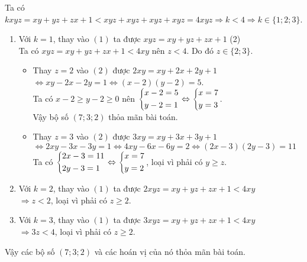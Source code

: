\begin{vd}
{Ta có $kxyz=xy+yz+zx+1<xyz+xyz+xyz+xyz=4xyz\Rightarrow k<4\Rightarrow k\in\{1;2;3\}$.
\begin{enumerate}
	\item Với $k=1$, thay vào $(1)$ ta được $xyz=xy+yz+zx+1$ \hfill (2)\\
	Ta có $xyz=xy+yz+zx+1<4xy$ nên $z<4$. Do đó $z\in\{2;3\}$.
	\begin{itemize}
		\item Thay $z=2$ vào $(2)$ được $2xy=xy+2x+2y+1$\\
		$\Leftrightarrow xy-2x-2y=1\Leftrightarrow(x-2)(y-2)=5$.\\
		Ta có $x-2\ge y-2\ge0$ nên $\left\{\begin{aligned}&x-2=5\\&y-2=1\end{aligned}\right.\Leftrightarrow\left\{\begin{aligned}&x=7\\&y=3\end{aligned}\right.$.\\
		Vậy bộ số $(7;3;2)$ thỏa mãn bài toán.
		\item Thay $z=3$ vào $(2)$ được $3xy=xy+3x+3y+1$\\
		$\Leftrightarrow2xy-3x-3y=1\Leftrightarrow4xy-6x-6y=2\Leftrightarrow(2x-3)(2y-3)=11$\\
		Ta có $\left\{\begin{aligned}&2x-3=11\\&2y-3=1\end{aligned}\right.\Leftrightarrow\left\{\begin{aligned}&x=7\\&y=2\end{aligned}\right.$, loại vì phải có $y\ge z$.
	\end{itemize}
	\item Với $k=2$, thay vào $(1)$ ta được $2xyz=xy+yz+zx+1<4xy$\\
	$\Rightarrow z<2$, loại vì phải có $z\ge2$.
	\item Với $k=3$, thay vào $(1)$ ta được $3xyz=xy+yz+zx+1<4xy$\\
	$\Rightarrow 3z<4$, loại vì phải có $z\ge2$.
\end{enumerate}
Vậy các bộ số $(7;3;2)$ và các hoán vị của nó thỏa mãn bài toán.}
\end{vd}
